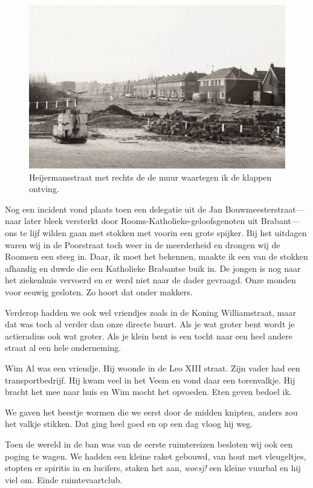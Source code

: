 \documentclass[12pt,twoside, openright]{memoir}
\begin{document}
\begin{figure}
\centering
\includegraphics[width=\textwidth]{img/ch7/Bouwmeesterstraat}
\caption*{\footnotesize Heijermansstraat met rechts de de muur waartegen ik de klappen ontving.}
\end{figure}

Nog een incident vond plaats toen een delegatie uit de Jan Bouwmeesterstraat--- naar later bleek versterkt door Rooms-Katholieke-geloofsgenoten uit Brabant---ons te lijf wilden gaan met stokken met voorin een grote spijker. Bij het uitdagen waren wij in de Poorstraat toch weer in de meerderheid en drongen wij de Roomsen een steeg in. Daar, ik moet het bekennen, maakte ik een van de stokken afhandig en duwde die een Katholieke Brabantse buik in. De jongen is nog naar het ziekenhuis vervoerd en er werd niet naar de dader gevraagd. Onze monden voor eeuwig gesloten. Zo hoort dat onder makkers.

Verderop hadden we ook wel vriendjes zoals in de Koning Williamstraat, maar dat was toch al verder dan onze directe buurt. Als je wat groter bent wordt je actieradius ook wat groter. Als je klein bent is een tocht naar een heel andere straat al een hele onderneming.

Wim Al was een vriendje. Hij woonde in de Leo XIII straat. Zijn vader had een transportbedrijf. Hij kwam veel in het Veem en vond daar een torenvalkje. Hij bracht het mee naar huis en Wim mocht het opvoeden. Eten geven bedoel ik. 

We gaven het beestje wormen die we eerst door de midden knipten, anders zou het valkje stikken. Dat ging heel goed en op een dag vloog hij weg.

Toen de wereld in de ban was van de eerste ruimtereizen besloten wij ook een poging te wagen. We hadden een kleine raket gebouwd, van hout met vleugeltjes, stopten er spiritis in en lucifers, staken het aan, \emph{woesj!} een kleine vuurbal en hij viel om. Einde ruimtevaartclub.
\end{document}
